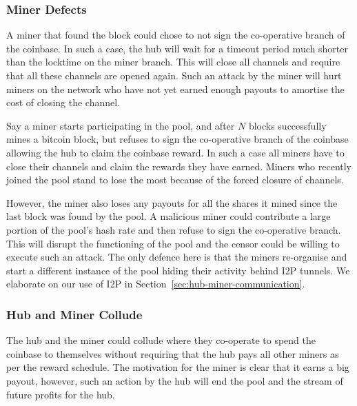 \documentclass{article}
\begin{document}
\subsubsection{Miner Defects}\label{ref:miner-defects}

A miner that found the block could chose to not sign the co-operative
branch of the coinbase. In such a case, the hub will wait for a
timeout period much shorter than the locktime on the miner
branch. This will close all channels and require that all these
channels are opened again. Such an attack by the miner will hurt
miners on the network who have not yet earned enough payouts to
amortise the cost of closing the channel.

Say a miner starts participating in the pool, and after $N$ blocks
successfully mines a bitcoin block, but refuses to sign the
co-operative branch of the coinbase allowing the hub to claim the
coinbase reward. In such a case all miners have to close their
channels and claim the rewards they have earned. Miners who recently
joined the pool stand to lose the most because of the forced closure
of channels.

However, the miner also loses any payouts for all the shares it mined
since the last block was found by the pool. A malicious miner could
contribute a large portion of the pool's hash rate and then refuse to
sign the co-operative branch. This will disrupt the functioning of the
pool and the censor could be willing to execute such an attack. The
only defence here is that the miners re-organise and start a different
instance of the pool hiding their activity behind I2P tunnels. We
elaborate on our use of I2P in
Section~\ref{sec:hub-miner-communication}.

\subsubsection{Hub and Miner Collude}\label{ref:collusion}

The hub and the miner could collude where they co-operate to spend the
coinbase to themselves without requiring that the hub pays all other
miners as per the reward schedule. The motivation for the miner is
clear that it earns a big payout, however, such an action by the hub
will end the pool and the stream of future profits for the hub.

\end{document}
